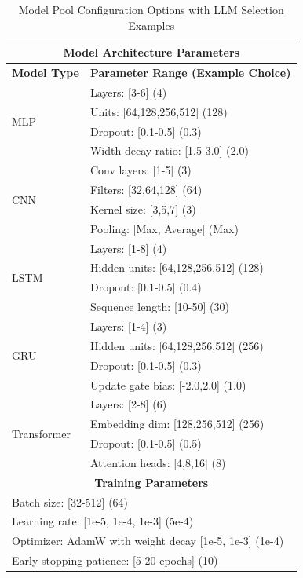 \documentclass[conference]{IEEEtran}
\begin{document}
\begin{table}[!t]
\caption{Model Pool Configuration Options with LLM Selection Examples}
\label{tab:model_config}
\begin{center}
\begin{tabular}{|p{2.5cm}|p{5cm}|}
\hline
\multicolumn{2}{|c|}{\textbf{Model Architecture Parameters}} \\
\hline
\textbf{Model Type} & \textbf{Parameter Range (Example Choice)} \\
\hline
\multirow{4}{*}{MLP} & Layers: [3-6] (4) \\
& Units: [64,128,256,512] (128) \\
& Dropout: [0.1-0.5] (0.3) \\
& Width decay ratio: [1.5-3.0] (2.0) \\
\hline
\multirow{4}{*}{CNN} & Conv layers: [1-5] (3) \\
& Filters: [32,64,128] (64) \\
& Kernel size: [3,5,7] (3) \\
& Pooling: [Max, Average] (Max) \\
\hline
\multirow{4}{*}{LSTM} & Layers: [1-8] (4) \\
& Hidden units: [64,128,256,512] (128) \\
& Dropout: [0.1-0.5] (0.4) \\
& Sequence length: [10-50] (30) \\
\hline
\multirow{4}{*}{GRU} & Layers: [1-4] (3) \\
& Hidden units: [64,128,256,512] (256) \\
& Dropout: [0.1-0.5] (0.3) \\
& Update gate bias: [-2.0,2.0] (1.0) \\
\hline
\multirow{4}{*}{Transformer} & Layers: [2-8] (6) \\
& Embedding dim: [128,256,512] (256) \\
& Dropout: [0.1-0.5] (0.5) \\
& Attention heads: [4,8,16] (8) \\
\hline
\multicolumn{2}{|c|}{\textbf{Training Parameters}} \\
\hline
\multicolumn{2}{|l|}{Batch size: [32-512] (64)} \\
\multicolumn{2}{|l|}{Learning rate: [1e-5, 1e-4, 1e-3] (5e-4)} \\
\multicolumn{2}{|l|}{Optimizer: AdamW with weight decay [1e-5, 1e-3] (1e-4)} \\
\multicolumn{2}{|l|}{Early stopping patience: [5-20 epochs] (10)} \\
\hline
\end{tabular}
\end{center}
\end{table}
\end{document}
